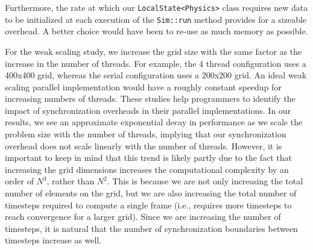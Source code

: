 Furthermore, the rate at which our \texttt{LocalState<Physics>} class requires new data
to be initialized at each execution of the \texttt{Sim::run} method provides for a sizeable
overhead.  A better choice would have been to re-use as much memory as possible.

For the weak scaling study, we increase the grid size with the same
factor as the increase in the number of threads. For example, the 4
thread configuration uses a 400x400 grid, whereas the serial
configuration uses a 200x200 grid. An ideal weak scaling parallel
implementation would have a roughly constant speedup for increasing
numbers of threads. These studies help programmers to identify the impact
of synchronization overheads in their parallel implementations. In our
results, we see an approximate exponential decay in performance as we
scale the problem size with the number of threads, implying that our
synchronization overhead does not scale linearly with the number of
threads. However, it is important to keep in mind that this trend is
likely partly due to the fact that increasing the grid dimensions
increases the computational complexity by an order of $N^3$, rather than
$N^2$. This is because we are not only increasing the total number of
elements on the grid, but we are also increasing the total number of
timesteps required to compute a single frame (i.e., requires more
timesteps to reach convergence for a larger grid). Since we are
increasing the number of timesteps, it is natural that the number of
synchronization boundaries between timesteps increase as well.


